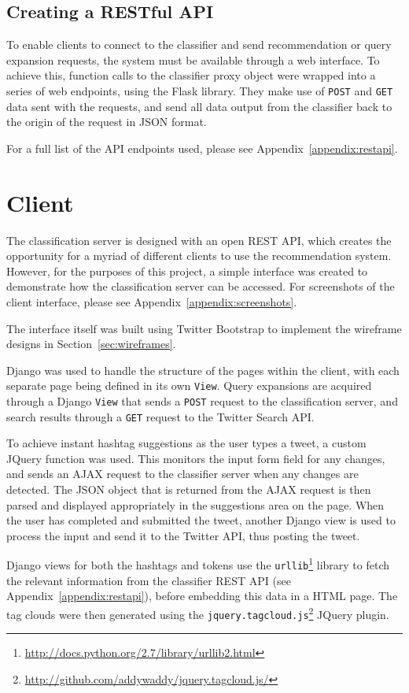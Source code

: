 \documentclass[11pt,a4paper]{report}
\begin{document}
\subsection{Creating a RESTful API}
To enable clients to connect to the classifier and send recommendation or query expansion requests, the system must be available through a web interface. To achieve this, function calls to the classifier proxy object were wrapped into a series of web endpoints, using the Flask library. They make use of \texttt{POST} and \texttt{GET} data sent with the requests, and send all data output from the classifier back to the origin of the request in JSON format.

For a full list of the API endpoints used, please see Appendix~\ref{appendix:restapi}.

\section{Client}
The classification server is designed with an open REST API, which creates the opportunity for a myriad of different clients to use the recommendation system. However, for the purposes of this project, a simple interface was created to demonstrate how the classification server can be accessed. For screenshots of the client interface, please see Appendix~\ref{appendix:screenshots}.

The interface itself was built using Twitter Bootstrap to implement the wireframe designs in Section~\ref{sec:wireframes}.

Django was used to handle the structure of the pages within the client, with each separate page being defined in its own \texttt{View}. Query expansions are acquired through a Django \texttt{View} that sends a \texttt{POST} request to the classification server, and search results through a \texttt{GET} request to the Twitter Search API.

To achieve instant hashtag suggestions as the user types a tweet, a custom JQuery function was used. This monitors the input form field for any changes, and sends an AJAX request to the classifier server when any changes are detected. The JSON object that is returned from the AJAX request is then parsed and displayed appropriately in the suggestions area on the page. When the user has completed and submitted the tweet, another Django view is used to process the input and send it to the Twitter API, thus posting the tweet.

Django views for both the hashtags and tokens use the \verb+urllib+\footnote{\url{http://docs.python.org/2.7/library/urllib2.html}} library to fetch the relevant information from the classifier REST API (see Appendix~\ref{appendix:restapi}), before embedding this data in a HTML page. The tag clouds were then generated using the \verb+jquery.tagcloud.js+\footnote{\url{http://github.com/addywaddy/jquery.tagcloud.js/}} JQuery plugin.
\end{document}
